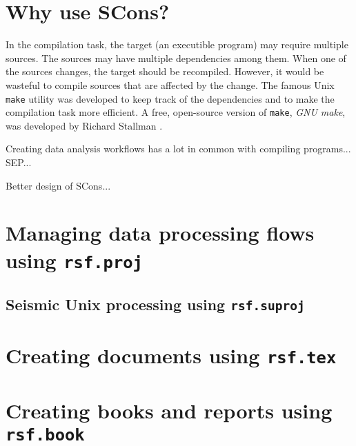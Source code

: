 \section{Why use SCons?}

In the compilation task, the target (an executible program) may
require multiple sources. The sources may have multiple dependencies
among them. When one of the sources changes, the target should be
recompiled. However, it would be wasteful to compile sources that are
affected by the change. The famous Unix \texttt{make} utility was
developed to keep track of the dependencies and to make the
compilation task more efficient. A free, open-source version of
\texttt{make}, \emph{GNU make}, was developed by Richard Stallman
\cite[]{make}.

Creating data analysis workflows has a lot in common with compiling
programs... SEP...

Better design of SCons...

\section{Managing data processing flows using \texttt{rsf.proj}}

\subsection{Seismic Unix processing using  \texttt{rsf.suproj}}

\section{Creating documents using \texttt{rsf.tex}}

\section{Creating books and reports using \texttt{rsf.book}}



